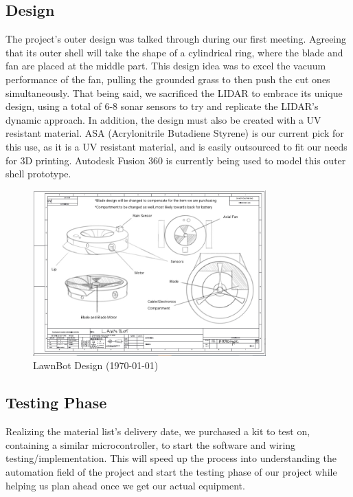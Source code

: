  
\subsection{Design}
The project's outer design was talked through during our first meeting. Agreeing that its outer shell will take the shape of a cylindrical ring, where the blade and fan are placed at the middle part. This design idea was to excel the vacuum performance of the fan, pulling the grounded grass to then push the cut ones simultaneously. That being said, we sacrificed the LIDAR to embrace its unique design, using a total of 6-8 sonar sensors to try and replicate the LIDAR's dynamic approach. In addition, the design must also be created with a UV resistant material. ASA (Acrylonitrile Butadiene Styrene) is our current pick for this use, as it is a UV resistant material, and is easily outsourced to fit our needs for 3D printing. Autodesk Fusion 360 is currently being used to model this outer shell prototype.\par

\begin{figure}[H]
    \centering
    \includegraphics[width = 0.8\textwidth]{root/Lawn_Bot_V1.jpg}
    \caption{LawnBot Design (\today)} 
    \label{fig:LawnBot_Design_V1}
\end{figure}


\subsection{Testing Phase}
Realizing the material list's delivery date, we purchased a kit to test on, containing a similar microcontroller, to start the software and wiring testing/implementation. This will speed up the process into understanding the automation field of the project and start the testing phase of our project while helping us plan ahead once we get our actual equipment. \par